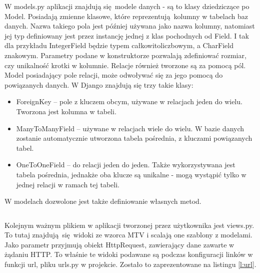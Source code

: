 W models.py aplikacji znajdują się modele danych - są to klasy dziedziczące po Model. Posiadają zmienne klasowe, które reprezentują kolumny w tabelach baz danych. Nazwa takiego pola jest później używana jako nazwa kolumny, natomiast jej typ definiowany jest przez instancję jednej z klas pochodnych od Field. I tak dla przykładu IntegerField będzie typem całkowitoliczbowym, a CharField znakowym. Parametry podane w konstruktorze pozwalają zdefiniować rozmiar, czy unikalność krotki w kolumnie. Relacje również tworzone są za pomocą pól. Model posiadający pole relacji, może odwoływać się za jego pomocą do powiązanych danych. W Django znajdują się trzy takie klasy:

\begin{itemize}
	\item ForeignKey -- pole z kluczem obcym, używane w relacjach jeden do wielu. Tworzona jest kolumna w tabeli.
	\item ManyToManyField -- używane w relacjach wiele do wielu. W bazie danych zostanie automatycznie utworzona tabela pośrednia, z kluczami powiązanych tabel.
	\item OneToOneField -- do relacji jeden do jeden. Także wykorzystywana jest tabela pośrednia, jednakże oba klucze są unikalne - mogą wystąpić tylko w jednej relacji w ramach tej tabeli.
\end{itemize}

W modelach dozwolone jest także definiowanie własnych metod.

\begin{singlespace}
	\vspace{0.3cm}
	\inputminted[fontsize=\footnotesize]{python}{src/models.py}
\end{singlespace}

Kolejnym ważnym plikiem w aplikacji tworzonej przez użytkownika jest views.py. To tutaj znajdują się widoki ze wzorca MTV i scalają one szablony z modelami. Jako parametr przyjmują obiekt HttpRequest, zawierający dane zawarte w żądaniu HTTP. To właśnie te widoki podawane są podczas konfiguracji linków w funkcji url, pliku urls.py w projekcie. Zostało to zaprezentowane na listingu \ref{l:url}.

\begin{singlespace}
	\vspace{0.3cm}
	\inputminted[fontsize=\footnotesize]{python}{src/views.py}
\end{singlespace}

